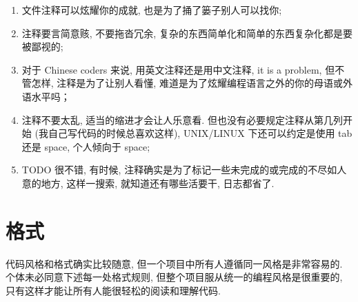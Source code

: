 \documentclass[a4paper,11pt,CJK]{article}
\begin{document}
\begin{CJK}{UTF8}{gbsn}
\begin{enumerate}
    \item 文件注释可以炫耀你的成就, 也是为了捅了篓子别人可以找你;

    \item 注释要言简意赅, 不要拖沓冗余, 复杂的东西简单化和简单的东西复杂化都是要被鄙视的;

    \item 对于 Chinese coders 来说, 用英文注释还是用中文注释, it is a problem, 但不管怎样, 注释是为了让别人看懂, 难道是为了炫耀编程语言之外的你的母语或外语水平吗；
    \item 注释不要太乱, 适当的缩进才会让人乐意看. 但也没有必要规定注释从第几列开始 (我自己写代码的时候总喜欢这样), UNIX/LINUX 下还可以约定是使用 tab 还是 space, 个人倾向于 space;

    \item TODO 很不错, 有时候, 注释确实是为了标记一些未完成的或完成的不尽如人意的地方, 这样一搜索, 就知道还有哪些活要干, 日志都省了.

\end{enumerate}
\newpage

\section{格式}
代码风格和格式确实比较随意, 但一个项目中所有人遵循同一风格是非常容易的. 个体未必同意下述每一处格式规则, 但整个项目服从统一的编程风格是很重要的, 只有这样才能让所有人能很轻松的阅读和理解代码.


\end{CJK}
\end{document}
